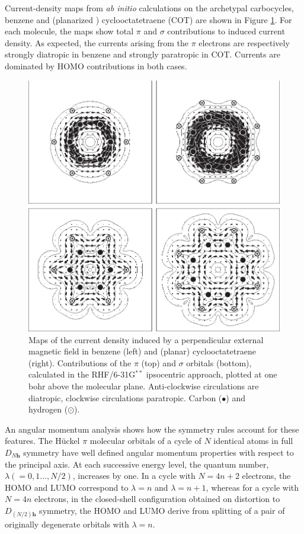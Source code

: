 Current-density maps from \textit{ab initio} calculations \cite{r04} on the archetypal carbocycles, benzene and (planarized \cite{r20a,r20b}) cyclooctatetraene (COT) are shown in Figure \ref{ch5.fig.f01}. For each
molecule, the maps show total $\pi$ and $\sigma$ contributions to induced current density.  As expected, the currents arising from the $\pi$ electrons are respectively strongly diatropic in benzene and strongly paratropic in COT. Currents are dominated by HOMO contributions in both cases.
\begin{figure}
\begin{center}
\includegraphics[scale=1.3]{huckel/figures/fig1.eps}
\caption{Maps of the current density induced by a perpendicular external magnetic field in benzene (left) and
(planar) cyclooctatetraene (right).  Contributions of the $\pi$ (top) and $\sigma$ orbitals (bottom), calculated in the
RHF/6-31G$^{**}$ ipsocentric approach, plotted at one bohr above the molecular plane.  Anti-clockwise circulations
are diatropic, clockwise circulations paratropic. Carbon ($\bullet$) and hydrogen ($\odot$).}
\label{ch5.fig.f01}
\end{center}
\end{figure}

An angular momentum analysis shows how the symmetry rules account for these features. The H\"uckel $\pi$ molecular
orbitals of a cycle of $N$ identical atoms in full $D_{N\mathbf{h}}$ symmetry have well defined angular momentum properties
with respect to the principal axis. At each successive energy level, the quantum number, $\lambda (=0,1...,N/2)$,
increases by one. In a cycle with $N = 4n+2$ electrons, the HOMO and LUMO correspond to $\lambda = n$ and
$\lambda = n+1$, whereas for a cycle with $N = 4n$ electrons, in the closed-shell configuration obtained on
distortion to $D_{(N/2)\mathbf{h}}$ symmetry, the HOMO and LUMO derive from splitting of a pair of originally degenerate
orbitals with $\lambda = n$.

